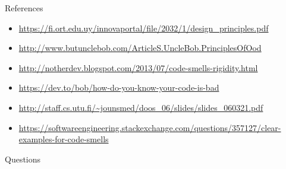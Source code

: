 \documentclass[xcolor=svgnames, handout]{beamer}
\begin{document}

\begin{frame}{References}
    \begin{itemize}
        \item \url{https://fi.ort.edu.uy/innovaportal/file/2032/1/design_principles.pdf}
        \item \url{http://www.butunclebob.com/ArticleS.UncleBob.PrinciplesOfOod}
        \item \url{http://notherdev.blogspot.com/2013/07/code-smells-rigidity.html}
        \item \url{https://dev.to/bob/how-do-you-know-your-code-is-bad}
        \item \url{http://staff.cs.utu.fi/~jounsmed/doos_06/slides/slides_060321.pdf}
        \item \url{https://softwareengineering.stackexchange.com/questions/357127/clear-examples-for-code-smells}
    \end{itemize}
\end{frame}


\begin{frame}{Questions}

\end{frame}
\end{document}
